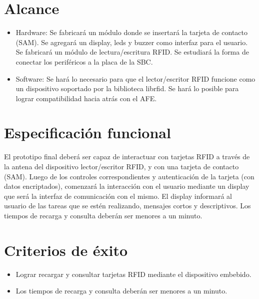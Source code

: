 \section{Alcance}

\begin{itemize}

\item Hardware: Se fabricar\'a un m\'odulo donde se insertar\'a la tarjeta de contacto (SAM).
Se agregar\'a un display, leds y buzzer como interfaz para el usuario. Se fabricar\'a un m\'odulo de lectura/escritura RFID. Se estudiar\'a la forma de conectar los perif\'ericos a la placa de la SBC.

\item Software: Se har\'a lo necesario para que el lector/escritor RFID funcione como un dispositivo soportado por la biblioteca librfid. Se hará lo posible para lograr compatibilidad hacia atrás con el AFE.
    
\end{itemize}

\section{Especificaci\'on funcional}

El prototipo final deber\'a ser capaz de interactuar con tarjetas RFID a trav\'es de la antena del dispositivo lector/escritor RFID, y con una tarjeta de contacto (SAM). Luego de los controles correspondientes y autenticaci\'on de la tarjeta (con datos encriptados), comenzar\'a la interacci\'on con el usuario mediante un display que ser\'a la interfaz de comunicaci\'on con el mismo. El display informar\'a al usuario de las tareas que se est\'en realizando, mensajes cortos y descriptivos. Los tiempos de recarga y consulta deber\'an ser menores a un minuto.

\section{Criterios de \'exito}

\begin{itemize}

\item Lograr recargar y consultar tarjetas RFID mediante el dispositivo embebido.

\item Los tiempos de recarga y consulta deber\'an ser menores a un minuto.

\end{itemize}